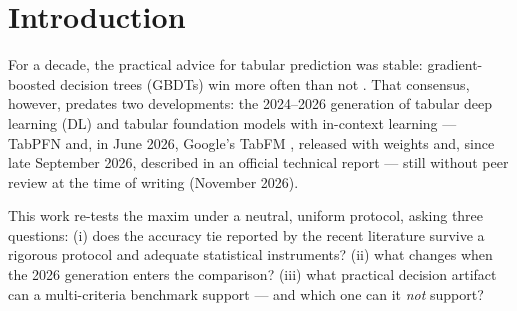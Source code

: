 \documentclass[11pt]{article}
\begin{document}
\section{Introduction}

For a decade, the practical advice for tabular prediction was stable:
gradient-boosted decision trees (GBDTs) win more often than not
\citep{grinsztajn2022,mcelfresh2023}. That consensus, however, predates two
developments: the 2024--2026 generation of tabular deep learning (DL)
\citep{realmlp2024,tabm2025} and tabular foundation models with in-context
learning --- TabPFN \citep{hollmann2025,priorlabs2025} and, in June 2026,
Google's TabFM \citep{tabfm2026}, released with weights and, since late
September 2026, described in an official technical report
\citep{kong2026} --- still without peer review at the time of writing
(November 2026).

This work re-tests the maxim under a neutral, uniform protocol, asking
three questions: (i) does the accuracy tie reported by the recent
literature survive a rigorous protocol and adequate statistical
instruments? (ii) what changes when the 2026 generation enters the
comparison? (iii) what practical decision artifact can a multi-criteria
benchmark support --- and which one can it \emph{not} support?
\end{document}
